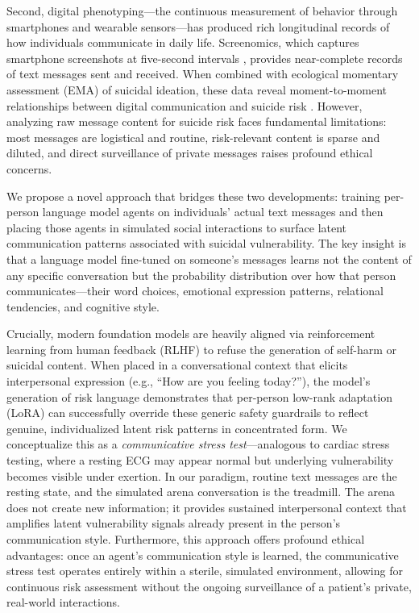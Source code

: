 \documentclass[review,12pt,authoryear]{elsarticle}
\begin{document}
Second, digital phenotyping---the continuous measurement of behavior through smartphones and wearable sensors---has produced rich longitudinal records of how individuals communicate in daily life. Screenomics, which captures smartphone screenshots at five-second intervals \citep{reeves2021screenomics}, provides near-complete records of text messages sent and received. When combined with ecological momentary assessment (EMA) of suicidal ideation, these data reveal moment-to-moment relationships between digital communication and suicide risk \citep{ammerman2026beyond}. However, analyzing raw message content for suicide risk faces fundamental limitations: most messages are logistical and routine, risk-relevant content is sparse and diluted, and direct surveillance of private messages raises profound ethical concerns.

We propose a novel approach that bridges these two developments: training per-person language model agents on individuals' actual text messages and then placing those agents in simulated social interactions to surface latent communication patterns associated with suicidal vulnerability. The key insight is that a language model fine-tuned on someone's messages learns not the content of any specific conversation but the probability distribution over how that person communicates---their word choices, emotional expression patterns, relational tendencies, and cognitive style. 

Crucially, modern foundation models are heavily aligned via reinforcement learning from human feedback (RLHF) to refuse the generation of self-harm or suicidal content. When placed in a conversational context that elicits interpersonal expression (e.g., ``How are you feeling today?''), the model's generation of risk language demonstrates that per-person low-rank adaptation (LoRA) can successfully override these generic safety guardrails to reflect genuine, individualized latent risk patterns in concentrated form. We conceptualize this as a \textit{communicative stress test}---analogous to cardiac stress testing, where a resting ECG may appear normal but underlying vulnerability becomes visible under exertion. In our paradigm, routine text messages are the resting state, and the simulated arena conversation is the treadmill. The arena does not create new information; it provides sustained interpersonal context that amplifies latent vulnerability signals already present in the person's communication style. Furthermore, this approach offers profound ethical advantages: once an agent's communication style is learned, the communicative stress test operates entirely within a sterile, simulated environment, allowing for continuous risk assessment without the ongoing surveillance of a patient's private, real-world interactions.
\end{document}
